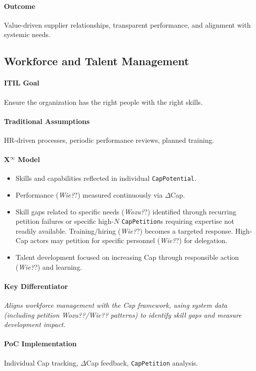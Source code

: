 \documentclass[12pt, a4paper]{scrartcl}
\newcommand{\Xinf}{X$^\infty$}                        %
\newcommand{\DeltaCap}{$\Delta$Cap}                    %
\newcommand{\CapPotential}{\texttt{CapPotential}}    %
\newcommand{\CapPetition}{\texttt{CapPetition}}        %
\newcommand{\Wozu}{\textit{Wozu?}}                      %
\newcommand{\Wie}{\textit{Wie?}}                        %
\begin{document}
\paragraph{Outcome} Value-driven supplier relationships, transparent performance, and alignment with systemic needs.

\subsection{Workforce and Talent Management} %
\paragraph{ITIL Goal} Ensure the organization has the right people with the right skills.
\paragraph{Traditional Assumptions} HR-driven processes, periodic performance reviews, planned training.
\paragraph*{\Xinf{} Model}
\begin{itemize}
    \item Skills and capabilities reflected in individual \CapPotential{}.
    \item Performance (\Wie?) measured continuously via \DeltaCap{}.
    \item Skill gaps related to specific needs (\Wozu?) identified through recurring petition failures or specific high-$N$ \CapPetition{}s requiring expertise not readily available. Training/hiring (\Wie?) becomes a targeted response. High-Cap actors may petition for specific personnel (\Wie?) for delegation.
    \item Talent development focused on increasing Cap through responsible action (\Wie?) and learning.
\end{itemize}
\paragraph{Key Differentiator} \textit{Aligns workforce management with the Cap framework, using system data (including petition \Wozu?/\Wie? patterns) to identify skill gaps and measure development impact.}
\paragraph{PoC Implementation} Individual Cap tracking, \DeltaCap{} feedback, \CapPetition{} analysis.
\end{document}
